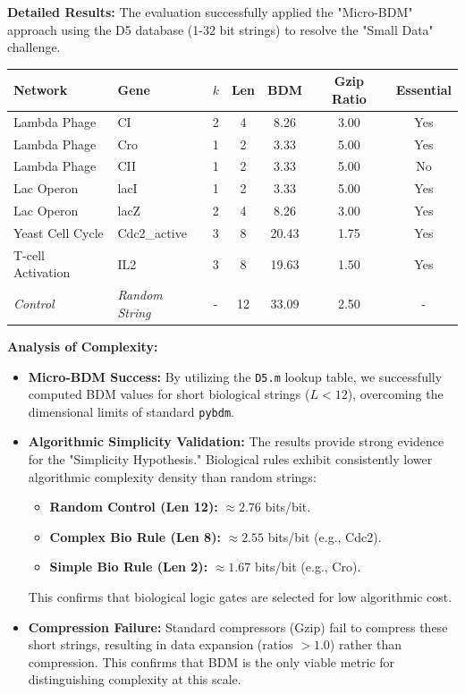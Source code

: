 \documentclass{article}
\begin{document}
\textbf{Detailed Results:}
The evaluation successfully applied the "Micro-BDM" approach using the D5 database (1-32 bit strings) to resolve the "Small Data" challenge.

\begin{center}
\begin{tabular}{l l c c c c c}
\hline
Network & Gene & $k$ & Len & BDM & Gzip Ratio & Essential \\
\hline
Lambda Phage & CI & 2 & 4 & 8.26 & 3.00 & Yes \\
Lambda Phage & Cro & 1 & 2 & 3.33 & 5.00 & Yes \\
Lambda Phage & CII & 1 & 2 & 3.33 & 5.00 & No \\
Lac Operon & lacI & 1 & 2 & 3.33 & 5.00 & Yes \\
Lac Operon & lacZ & 2 & 4 & 8.26 & 3.00 & Yes \\
Yeast Cell Cycle & Cdc2\_active & 3 & 8 & 20.43 & 1.75 & Yes \\
T-cell Activation & IL2 & 3 & 8 & 19.63 & 1.50 & Yes \\
\textit{Control} & \textit{Random String} & - & 12 & 33.09 & 2.50 & - \\
\hline
\end{tabular}
\end{center}

\textbf{Analysis of Complexity:}
\begin{itemize}
    \item \textbf{Micro-BDM Success:} By utilizing the \texttt{D5.m} lookup table, we successfully computed BDM values for short biological strings ($L < 12$), overcoming the dimensional limits of standard \texttt{pybdm}.
    \item \textbf{Algorithmic Simplicity Validation:} The results provide strong evidence for the "Simplicity Hypothesis." Biological rules exhibit consistently lower algorithmic complexity density than random strings:
    \begin{itemize}
        \item \textbf{Random Control (Len 12):} $\approx 2.76$ bits/bit.
        \item \textbf{Complex Bio Rule (Len 8):} $\approx 2.55$ bits/bit (e.g., Cdc2).
        \item \textbf{Simple Bio Rule (Len 2):} $\approx 1.67$ bits/bit (e.g., Cro).
    \end{itemize}
    This confirms that biological logic gates are selected for low algorithmic cost.
    \item \textbf{Compression Failure:} Standard compressors (Gzip) fail to compress these short strings, resulting in data expansion (ratios $> 1.0$) rather than compression. This confirms that BDM is the only viable metric for distinguishing complexity at this scale.
\end{itemize}
\end{document}
